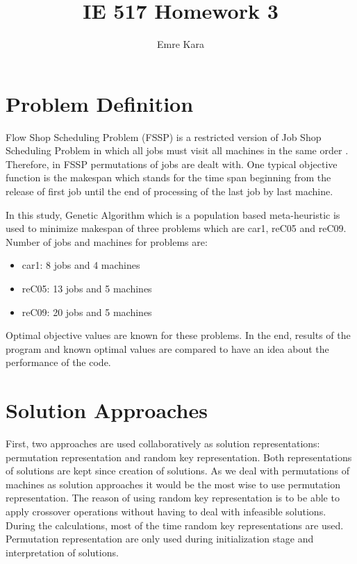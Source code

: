 \documentclass[11pt]{article}
\author{Emre Kara}
\title{IE 517 Homework 3}
\begin{document}
    
    \maketitle

    \hypertarget{def}{%
\section{Problem Definition}\label{def}}

Flow Shop Scheduling Problem (FSSP) is a restricted version of Job Shop Scheduling Problem in which all jobs must visit all machines in the same order \cite{}. Therefore, in FSSP permutations of jobs are dealt with. One typical objective function is the makespan which stands for the time span beginning from the release of first job until the end of processing of the last job by last machine.

In this study, Genetic Algorithm which is a population based meta-heuristic is used to minimize makespan of three problems which are  car1, reC05 and reC09. Number of jobs and machines for problems are:

\begin{itemize}
  \item car1: 8 jobs and 4 machines
  \item reC05: 13 jobs and 5 machines 
  \item reC09: 20 jobs and 5 machines
\end{itemize}

Optimal objective values are known for these problems. In the end, results of the program and known optimal values are compared to have an idea about the performance of the code.

    \hypertarget{approach}{%
\section{Solution Approaches}\label{approach}}

First, two approaches are used collaboratively as solution representations: permutation representation and random key representation. Both representations of solutions are kept since creation of solutions. As we deal with permutations of machines as solution approaches it would be the most wise to use permutation representation. The reason of using random key representation is to be able to apply crossover operations without having to deal with infeasible solutions. During the calculations, most of the time random key representations are used. Permutation representation are only used during initialization stage and interpretation of solutions.
\end{document}
